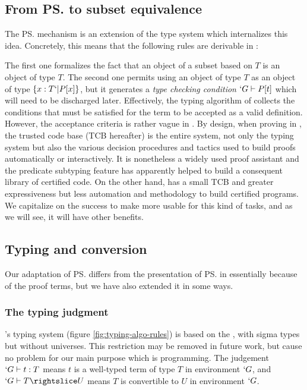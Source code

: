 \documentclass[twocolumn]{article}
\begin{document}
\subsection{From \ps{} to subset equivalence}
The \ps{} mechanism \cite{Rushby98:TSE, Shankar&Owre:WADT99}
is an extension of the \PVS type system which internalizes this idea.
Concretely, this means that the following rules are derivable in \PVS:
\begin{figure}[h]
  \begin{center}
    \DP
    \DP
  \end{center}
  \vspace{-1em}
  \label{PVS:rules}
  \caption{\PVS}
\end{figure}

The first one formalizes the fact that an object of a subset based on
$T$ is an object of type $T$. The second one permits using an object of
type $T$ as an object of type $\{ x : T `| P[x] \}$, but it generates a
\emph{type checking condition} $`G \vdash P[t]$ which will need to be
discharged later. Effectively, the typing algorithm of \PVS{} collects
the conditions that must be satisfied for the term to be accepted as a
valid definition. However, the acceptance criteria is rather vague in
\PVS{}. By design, when proving in \PVS{}, the trusted code base (TCB
hereafter) is the entire system, not only the typing system but also the
various decision procedures and tactics used to build proofs
automatically or interactively. It is nonetheless a widely used proof
assistant and the predicate subtyping feature has apparently helped to
build a consequent library of certified code. On the other hand, \Coq
has a small TCB and greater expressiveness but less automation and
methodology to build certified programs. We capitalize on the \PVS
success to make \Coq more usable for this kind of tasks, and as we will see,
it will have other benefits.

\subsection{Typing and conversion}
Our adaptation of \ps{} differs from the presentation of
\ps{} in \cite{Rushby98:TSE, Shankar&Owre:WADT99} essentially because of the
proof terms, but we have also extended it in some ways. 

\subsubsection{The typing judgment}
\Russell{}'s typing system (figure \ref{fig:typing-algo-rules}) is based
on the \ECCfull \cite{Luo:ECC}, with sigma types but without universes.
This restriction may be removed in future work, but cause no problem for
our main purpose which is programming. The judgement $`G \vdash t : T$
means $t$ is a well-typed term of type $T$ in environment $`G$, and $`G
\typed T \subd U$ means $T$ is convertible to $U$ in environment $`G$.
\end{document}
